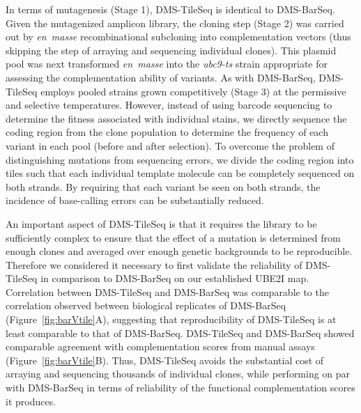 In terms of mutagenesis (Stage 1), DMS-TileSeq is identical to DMS-BarSeq.  Given the mutagenized amplicon library, the cloning step (Stage 2) was carried out by \textit{en~masse} recombinational subcloning into complementation vectors (thus skipping the step of arraying and sequencing individual clones).  This plasmid pool was next transformed \textit{en~masse} into the \textit{ubc9-ts} strain appropriate for assessing the complementation ability of  variants. As with DMS-BarSeq, DMS-TileSeq employs pooled strains grown competitively (Stage 3) at the permissive and selective temperatures. However, instead of using barcode sequencing to determine the fitness associated with individual stains, we directly sequence the coding region from the clone population to determine the frequency of each variant in each pool (before and after selection). To overcome the problem of distinguishing mutations from sequencing errors, we divide the coding region into tiles such that each individual template molecule can be completely sequenced on both strands.  By requiring that each variant be seen on both strands, the incidence of base-calling errors can be substantially reduced. %

An important aspect of DMS-TileSeq is that it requires the library to be sufficiently complex to ensure that the effect of a mutation is determined from enough clones and averaged over enough genetic backgrounds to be reproducible. Therefore we considered it necessary to first validate the reliability of DMS-TileSeq in comparison to DMS-BarSeq on our established UBE2I map. Correlation between DMS-TileSeq and DMS-BarSeq was comparable to the correlation observed between biological replicates of DMS-BarSeq (Figure~\ref{fig:barVtile}A), suggesting that reproducibility of DMS-TileSeq is at least comparable to that of DMS-BarSeq. DMS-TileSeq and DMS-BarSeq showed comparable agreement with complementation scores from manual assays (Figure~\ref{fig:barVtile}B). Thus, DMS-TileSeq avoids the substantial cost of arraying and sequencing thousands of individual clones, while performing on par with DMS-BarSeq in terms of reliability of the functional complementation scores it produces.

